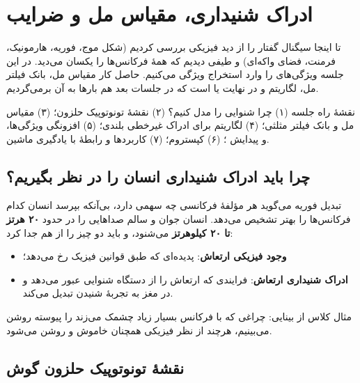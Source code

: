 \chapter{ادراک شنیداری، مقیاس مل و ضرایب }

تا اینجا سیگنال گفتار را از دید فیزیکی بررسی کردیم (شکل موج، فوریه، هارمونیک، فرمنت، فضای واکه‌ای) و طیفی دیدیم که همهٔ فرکانس‌ها را یکسان می‌دید. در این جلسه ویژگی‌های  را وارد استخراج ویژگی می‌کنیم. حاصل کار مقیاس مل، بانک فیلتر مل، لگاریتم و در نهایت  یا  است که در جلسات بعد هم بارها به آن برمی‌گردیم.

\begin{exambox}{نقشهٔ راه جلسه}
(۱) چرا شنوایی را مدل کنیم؟ (۲) نقشهٔ تونوتوپیک حلزون؛ (۳) مقیاس مل و بانک فیلتر مثلثی؛ (۴) لگاریتم برای ادراک غیرخطی بلندی؛ (۵) افزونگی ویژگی‌ها،  و پیدایش ؛ (۶) کپستروم؛ (۷) کاربردها و رابطهٔ  با یادگیری ماشین.
\end{exambox}

\section{چرا باید ادراک شنیداری انسان را در نظر بگیریم؟}

تبدیل فوریه می‌گوید هر مؤلفهٔ فرکانسی چه سهمی دارد، بی‌آنکه بپرسد انسان کدام فرکانس‌ها را بهتر تشخیص می‌دهد. انسان جوان و سالم صداهایی را در حدود \textbf{۲۰ هرتز تا ۲۰ کیلوهرتز} می‌شنود، و باید دو چیز را از هم جدا کرد:
\begin{itemize}
  \item \textbf{وجود فیزیکی ارتعاش}: پدیده‌ای که طبق قوانین فیزیک رخ می‌دهد؛
  \item \textbf{ادراک شنیداری ارتعاش}: فرایندی که ارتعاش را از دستگاه شنوایی عبور می‌دهد و در مغز به تجربهٔ شنیدن تبدیل می‌کند.
\end{itemize}
مثال کلاس از بینایی: چراغی که با فرکانس بسیار زیاد چشمک می‌زند را پیوسته روشن می‌بینیم، هرچند از نظر فیزیکی همچنان خاموش و روشن می‌شود.

\section{نقشهٔ تونوتوپیک حلزون گوش}

